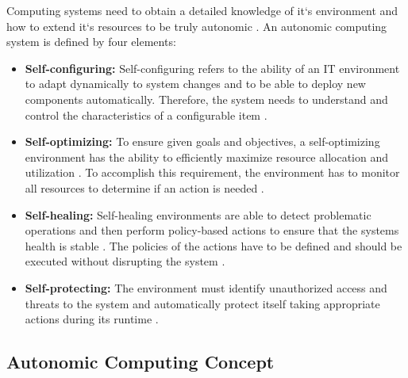Computing systems need to obtain a detailed knowledge of it`s environment and how to extend it`s resources to be truly autonomic \cite{Murch2004Autonomic}.
An autonomic computing system is defined by four elements:
\begin{itemize}
\item \textbf{Self-configuring:}
Self-configuring refers to the ability of an IT environment to adapt dynamically to system changes and to be able to deploy new components automatically. Therefore, the system needs to understand and control the characteristics of a configurable item \cite{Murch2004Autonomic, Sinreich2006AnAB}.

\item \textbf{Self-optimizing:}
To ensure given goals and objectives, a self-optimizing environment has the ability to efficiently maximize resource allocation and utilization \cite{Jacob2004AutonomicSolution}. To accomplish this requirement, the environment has to monitor all resources to determine if an action is needed \cite{Murch2004Autonomic}.

\item \textbf{Self-healing:}
Self-healing environments are able to detect problematic operations and then perform policy-based actions to ensure that the systems health is stable \cite{Sinreich2006AnAB, Jacob2004AutonomicSolution}. The policies of the actions have to be defined and should be executed without disrupting the system \cite{Sinreich2006AnAB, Jacob2004AutonomicSolution}.

\item \textbf{Self-protecting:}
The environment must identify unauthorized access and threats to the system and automatically protect itself taking appropriate actions during its runtime \cite{Sinreich2006AnAB, Jacob2004AutonomicSolution}.
\end{itemize}


\subsection{Autonomic Computing Concept}

